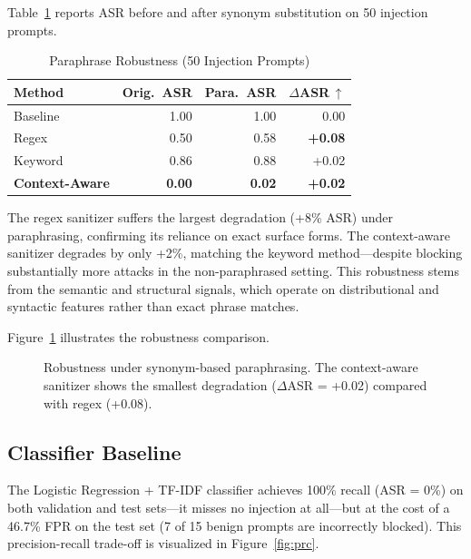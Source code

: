 \documentclass[10pt,conference]{IEEEtran}
\begin{document}
Table~\ref{tab:robustness} reports ASR before and after synonym
substitution on 50 injection prompts.

\begin{table}[t]
\caption{Paraphrase Robustness (50 Injection Prompts)}
\label{tab:robustness}
\centering
\begin{tabular}{lrrr}
\toprule
Method & Orig.\ ASR & Para.\ ASR & $\Delta$ASR\,$\uparrow$ \\
\midrule
Baseline       & 1.00 & 1.00 & 0.00 \\
Regex          & 0.50 & 0.58 & \textbf{+0.08} \\
Keyword        & 0.86 & 0.88 & +0.02 \\
\textbf{Context-Aware} & \textbf{0.00} & \textbf{0.02}
               & \textbf{+0.02} \\
\bottomrule
\end{tabular}
\end{table}

The regex sanitizer suffers the largest degradation (+8\% ASR) under
paraphrasing, confirming its reliance on exact surface forms.
The context-aware sanitizer degrades by only +2\%, matching the
keyword method—despite blocking substantially more attacks in the
non-paraphrased setting.
This robustness stems from the semantic and structural signals, which
operate on distributional and syntactic features rather than
exact phrase matches.

Figure~\ref{fig:robust} illustrates the robustness comparison.

\begin{figure}[t]
  \centering
  \caption{Robustness under synonym-based paraphrasing.
           The context-aware sanitizer shows the smallest degradation
           ($\Delta$ASR = +0.02) compared with regex (+0.08).}
  \label{fig:robust}
\end{figure}

\subsection{Classifier Baseline}

The Logistic Regression + TF-IDF classifier achieves 100\% recall
(ASR = 0\%) on both validation and test sets—it misses no injection
at all—but at the cost of a 46.7\% FPR on the test set
(7 of 15 benign prompts are incorrectly blocked).
This precision-recall trade-off is visualized in
Figure~\ref{fig:prc}.
\end{document}
